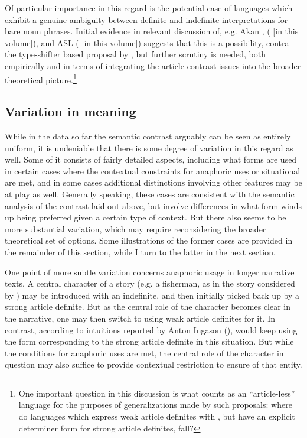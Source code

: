 \documentclass[output=paper
,modfonts
,nonflat]{langscibook}
\begin{document}
Of particular importance in this regard is the potential case of languages which
exhibit a genuine ambiguity between definite and indefinite
interpretations for bare noun phrases. Initial evidence in relevant
discussion of, e.g. Akan \citep{ArkohMatthewson2013}, 
(\citealt{SereikaiteToAppear} [in this volume]), and ASL (\citealt{Koulidobrova2012,Irani2017} [in this volume])
suggests that this is a possibility, contra the type-shifter based
proposal by \citet{Dayal2016}, but further scrutiny is needed, both
empirically and in terms of integrating the article-contrast
issues into the broader theoretical picture.\footnote{One important question in this discussion
  is what counts as an ``article-less'' language for the purposes of
  generalizations made by such proposals: where do languages which
  express weak article definites with , but have an
  explicit determiner form for strong article definites, fall?}






\subsection{Variation in meaning}


While in the data so far the semantic contrast arguably can be seen
as entirely
uniform, it is undeniable that there is some degree of variation in
this regard as well. Some of it consists of fairly detailed aspects,
including what forms are used in certain cases where the contextual
constraints for anaphoric uses or
situational  are met, and in some cases additional
distinctions involving other features may be
at play as well. Generally speaking, these cases are consistent with
the semantic analysis of the contrast laid out above, but involve
differences in what form winds up being preferred given a certain type
of context. But there also seems to be more substantial
variation, which may require reconsidering the broader theoretical set
of options. Some illustrations of the former cases are provided in
the remainder of this section, while I turn to the latter in the next section.

One point of more subtle variation concerns anaphoric usage in longer
narrative texts. A central character of a story (e.g. a fisherman, as
in the  story considered by  \citealt{Ebert1971b}) may be
introduced with an indefinite, and then initially picked back up by a
strong article definite. But as the central role of the character becomes
clear in the narrative, one may then switch to using weak article
definites for it. In contrast, according to intuitions reported by Anton Ingason (\pc),  would keep using the form corresponding
to the strong article definite in this situation. But while the
conditions for anaphoric uses are met, the central role of the
character in question may also suffice to provide contextual
restriction to ensure  of that entity.
\end{document}
